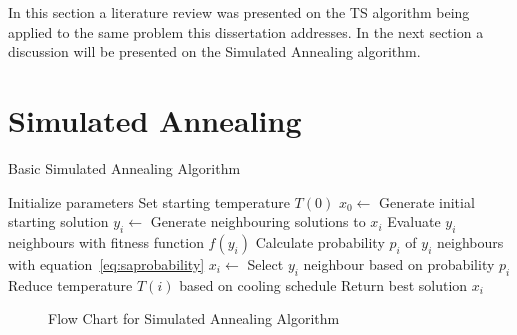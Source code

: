 In this section a literature review was presented on the TS algorithm being applied to the same problem this dissertation addresses. In the next section a discussion will be presented on the Simulated Annealing algorithm.
\section{Simulated Annealing}
\begin{algorithm}
\caption{Basic Simulated Annealing Algorithm}
\label{alg:SA}
	\begin{algorithmic}[1]
		\STATE Initialize parameters
		\STATE Set starting temperature $T(0)$
		\STATE $x_0 \leftarrow$ Generate initial starting solution
			\STATE $y_i \leftarrow$ Generate neighbouring solutions to $x_i$
			\STATE Evaluate $y_i$ neighbours with fitness function $f(y_i)$
			\STATE Calculate probability $p_i$ of $y_i$ neighbours with equation~\ref{eq:saprobability}
			\STATE $x_i \leftarrow$ Select $y_i$ neighbour based on probability $p_i$
			\STATE Reduce temperature $T(i)$ based on cooling schedule
		\ENDWHILE
		\STATE Return best solution $x_i$
	\end{algorithmic}
\end{algorithm}
\begin{figure}[htbp!]
	\begin{center}
	\caption{Flow Chart for Simulated Annealing Algorithm}
	\label{fig:SimulatedAnnealingFlowChart}
	\end{center}
\end{figure}
